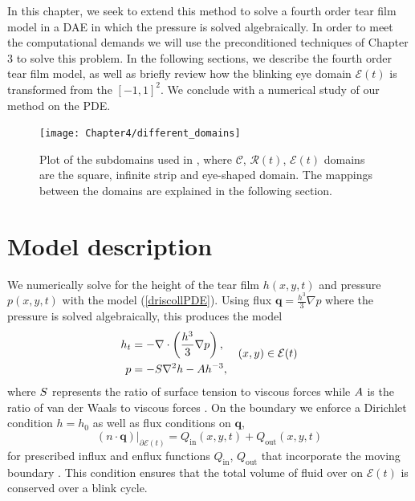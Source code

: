 In this chapter, we seek to extend this method to solve a fourth order tear film model in a DAE in which the pressure is solved algebraically. In order to meet the computational demands we will use the preconditioned techniques of Chapter 3 to solve this problem. In the following sections, we describe the fourth order tear film model, as well as briefly review how the blinking eye domain $\mathcal{E}(t)$ is transformed from the $[-1,1]^2$. We conclude with a numerical study of our method on the PDE.


\begin{figure}
  \centering
  \texttt{[image: Chapter4/different\_domains]}
  \caption{Plot of the subdomains used in \cite{driscoll2018simulation}, where $\mathcal{C}$, $\mathcal{R}(t)$, $\mathcal{E}(t)$ domains are the square, infinite strip and eye-shaped domain. The mappings between the domains are explained in the following section.}
  \label{driscoll_eye}
\end{figure}
	
\section{Model description}

We numerically solve for the height of the tear film $h(x,y,t)$ and pressure $p(x,y,t)$ with the model (\ref{driscollPDE}). Using flux $\bm{q} =  \frac{h^3}{3} \nabla p$ where the pressure is solved algebraically, this produces the model
\begin{align}
\begin{aligned}
h_t &= - \nabla \cdot \left( \frac{h^3}{3} \nabla p \right), \\
p &= - S \nabla^2 h - A h^{-3},
\end{aligned} \quad (x,y) \in \mathcal{E}(t)
\label{the_pde}
\end{align}
where $S$ represents the ratio of surface tension to viscous forces while $A$ is the ratio of van der Waals to viscous forces \cite{braun2015dynamics}. On the boundary we enforce a Dirichlet condition $h=h_0$ as well as flux conditions on $\bm{q}$,
\begin{equation}
\label{normal_conds}
(n \cdot \bm{q})\vert_{\partial \mathcal{E}(t)} = Q_{\text{in}}(x,y,t)+Q_{\text{out}}(x,y,t)
\end{equation}
for prescribed influx and enflux functions $Q_{\text{in}}$, $Q_{\text{out}}$ that incorporate the moving boundary  \cite{li2015computed,heryudono2007single,braun2015dynamics}.
This condition ensures that the total volume of fluid over on $\mathcal{E}(t)$ is conserved over a blink cycle.

